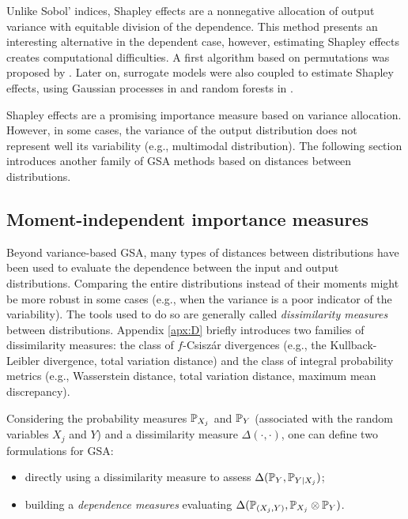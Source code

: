 Unlike Sobol' indices, Shapley effects are a nonnegative allocation of output variance with equitable division of the dependence. 
This method presents an interesting alternative in the dependent case, however, estimating Shapley effects creates computational difficulties. 
A first algorithm based on permutations was proposed by \citet{song_2016_shapley}. 
Later on, surrogate models were also coupled to estimate Shapley effects, using Gaussian processes in \citet{nazben_2019_shapley}\footnotemark and random forests in \citet{benard_2022_shaff}. 


Shapley effects are a promising importance measure based on variance allocation. 
However, in some cases, the variance of the output distribution does not represent well its variability (e.g., multimodal distribution). 
The following section introduces another family of GSA methods based on distances between distributions.


\subsection{Moment-independent importance measures}
Beyond variance-based GSA, many types of distances between distributions have been used to evaluate the dependence between the input and output distributions. 
Comparing the entire distributions instead of their moments might be more robust in some cases (e.g., when the variance is a poor indicator of the variability). 
The tools used to do so are generally called \textit{dissimilarity measures} between distributions.  
Appendix \ref{apx:D} briefly introduces two families of dissimilarity measures: the class of $f$-Csisz\'{a}r divergences (e.g., the Kullback-Leibler divergence, total variation distance) and the class of integral probability metrics (e.g., Wasserstein distance, total variation distance, maximum mean discrepancy). 

Considering the probability measures $\P_{X_j}$ and $\P_{Y}$ (associated with the random variables $X_j$ and $Y$) and a dissimilarity measure $\Delta(\cdot, \cdot)$, one can define two formulations for GSA: 
\begin{itemize}
    \item directly using a dissimilarity measure to assess $\Delta(\P_Y, \P_{Y |X_j})$;
    \item building a \textit{dependence measures} evaluating $\Delta(\P_{(X_j, Y)}, \P_{X_j} \otimes \P_Y)$.
\end{itemize}

